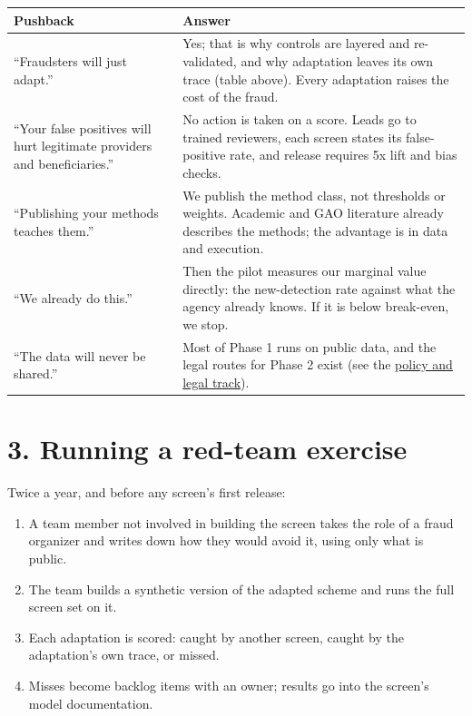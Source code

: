 \documentclass[letterpaper,11pt]{article}
\providecommand{\tightlist}{\setlength{\itemsep}{0pt}\setlength{\parskip}{0pt}}
\begin{document}
\begingroup\small\setlength{\tabcolsep}{4pt}\renewcommand{\arraystretch}{1.25}
\begin{longtable}[l]{@{}>{\raggedright\arraybackslash}p{}>{\raggedright\arraybackslash}p{}@{}}
\rowcolor{coolblack}\leavevmode\color{white}\bfseries Pushback & \leavevmode\color{white}\bfseries Answer \\
\endhead
``Fraudsters will just adapt.'' & Yes; that is why controls are layered and re-validated, and why adaptation leaves its own trace (table above). Every adaptation raises the cost of the fraud. \\
``Your false positives will hurt legitimate providers and beneficiaries.'' & No action is taken on a score. Leads go to trained reviewers, each screen states its false-positive rate, and release requires 5x lift and bias checks. \\
``Publishing your methods teaches them.'' & We publish the method class, not thresholds or weights. Academic and GAO literature already describes the methods; the advantage is in data and execution. \\
``We already do this.'' & Then the pilot measures our marginal value directly: the new-detection rate against what the agency already knows. If it is below break-even, we stop. \\
``The data will never be shared.'' & Most of Phase 1 runs on public data, and the legal routes for Phase 2 exist (see the \href{../policy/legal_track.pdf}{policy and legal track}). \\
\end{longtable}\endgroup

\hypertarget{running-a-red-team-exercise}{%
\section*{3. Running a red-team
exercise}\label{running-a-red-team-exercise}}

Twice a year, and before any screen's first release:

\begin{enumerate}
\def\labelenumi{\arabic{enumi}.}
\tightlist
\item
  A team member not involved in building the screen takes the role of a
  fraud organizer and writes down how they would avoid it, using only
  what is public.
\item
  The team builds a synthetic version of the adapted scheme and runs the
  full screen set on it.
\item
  Each adaptation is scored: caught by another screen, caught by the
  adaptation's own trace, or missed.
\item
  Misses become backlog items with an owner; results go into the
  screen's model documentation.
\end{enumerate}
\end{document}
